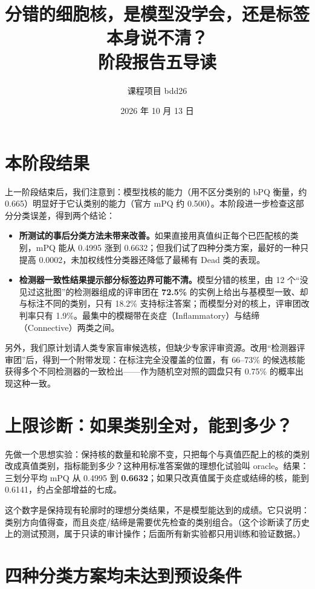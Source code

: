 \documentclass[12pt,a4paper]{article}
\title{\bfseries 分错的细胞核，是模型没学会，还是标签本身说不清？\\[7pt]
\large 阶段报告五导读}
\author{课程项目 bdd26}
\date{2026 年 10 月 13 日}
\begin{document}
\maketitle

\section*{本阶段结果}

上一阶段结束后，我们注意到：模型找核的能力（用不区分类别的 bPQ 衡量，约 0.665）明显好于它认类别的能力（官方 mPQ 约 0.500）。本阶段进一步检查这部分分类误差，得到两个结论：

\begin{itemize}
\item \textbf{所测试的事后分类方法未带来改善。}如果直接用真值纠正每个已匹配核的类别，mPQ 能从 0.4995 涨到 0.6632；但我们试了四种分类方案，最好的一种只提高 0.0002，未加权线性分类器还降低了最稀有 Dead 类的表现。
\item \textbf{检测器一致性结果提示部分标签边界可能不清。}模型分错的核里，由 12 个“没见过这批图”的检测器组成的评审团在 \textbf{72.5\%} 的实例上给出与基模型一致、却与标注不同的类别，只有 18.2\% 支持标注答案；而模型分对的核上，评审团改判率只有 1.9\%。最集中的模糊带在炎症（Inflammatory）与结缔（Connective）两类之间。
\end{itemize}

另外，我们原计划请人类专家盲审候选核，但缺少专家评审资源。改用“检测器评审团”后，得到一个附带发现：在标注完全没覆盖的位置，有 66--73\% 的候选核能获得多个不同检测器的一致检出——作为随机空对照的圆盘只有 0.75\% 的概率出现这种一致。

\section*{上限诊断：如果类别全对，能到多少？}

先做一个思想实验：保持核的数量和轮廓不变，只把每个与真值匹配上的核的类别改成真值类别，指标能到多少？这种用标准答案做的理想化试验叫 oracle。结果：三划分平均 mPQ 从 0.4995 到 \textbf{0.6632}；如果只改真值属于炎症或结缔的核，能到 0.6141，约占全部增益的七成。

这个数字是保持现有轮廓时的理想分类结果，不是模型能达到的成绩。它只说明：类别方向值得查，而且炎症/结缔是需要优先检查的类别组合。（这个诊断读了历史上的测试预测，属于只读的审计操作；后面所有新实验都只用训练和验证数据。）

\section*{四种分类方案均未达到预设条件}
\end{document}
